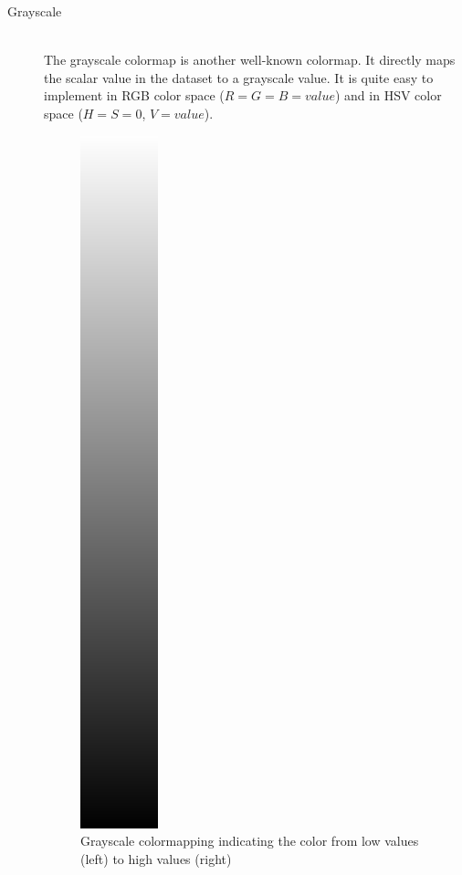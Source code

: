 \begin{description}
			\item[Grayscale] ~\\ 
			The grayscale colormap is another well-known colormap.
			It directly maps the scalar value in the dataset to a grayscale value.
			It is quite easy to implement in RGB color space (\(R = G = B = value\)) and in HSV color space (\(H = S = 0\), \(V = value\)).
			\begin{figure}[htb]
				\centering
				\includegraphics[angle=270, width=\linewidth, totalheight=1em, frame]{./content/pictures/black_white.png}
				\caption{Grayscale colormapping indicating the color from low values (left) to high values (right)}
			\end{figure}


\end{description}
